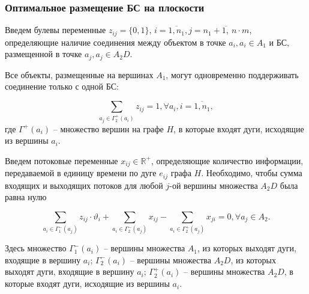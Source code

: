\begin{frame}
    \frametitle{Оптимальное размещение БС на плоскости}
    \fontsize{8pt}{7.2}\selectfont

    

    Введем булевы переменные $z_{ij} = \{0, 1\}$, $ i = \overline{1,n_1}, j = \overline{n_1+1, \ n \cdot m}$, определяющие наличие соединения между объектом в точке $a_i, a_i \in A_1$  и БС, размещенной в точке $a_j, a_j \in A_2D$.


    Все объекты, размещенные на вершинах $A_1$, могут одновременно поддерживать соединение только с одной БС:


    \begin{equation}\label{eq:part3_only_1_link_from_device}
        \sum_{a_j \in \Gamma_2^+(a_i)} z_{ij} = 1, \forall a_i, i =\overline{1, n_1},
    \end{equation} 
    где $\Gamma^+(a_i)$ -- множество вершин на графе $H$, в которые входят дуги, исходящие из вершины $a_i$.

    \bigskip

    Введем потоковые переменные $x_{ij} \in \mathbb{R}^+$, определяющие количество информации, передаваемой в единицу времени по дуге $e_{ij}$ графа $H$. Необходимо, чтобы сумма входящих и выходящих потоков для любой $j$-ой вершины множества $A_2D$ была равна нулю  

    \begin{equation}\label{eq:part3_sta_io_flows} 
        \sum_{a_i \in \Gamma_1^-(a_j)} z_{ij} \cdot \vartheta_i + \sum_{a_i \in \Gamma_2^-(a_j)} x_{ij} -  \sum_{a_i \in \Gamma_2^+(a_j)} x_{ji} =0 ,\forall a_j \in A_2. 
    \end{equation} 

    Здесь множество $\Gamma_1^-(a_i)$ -- вершины множества $A_1$, из которых выходят дуги, входящие в вершину $a_i$; $\Gamma_2^-(a_i)$ -- вершины множества $A_2D$, из которых выходят дуги, входящие в  вершину $a_i$; $\Gamma_2^+(a_i)$ -- вершины множества $A_2D$, в которые входят дуги, исходящие из вершины  $a_i$.



\end{frame}

